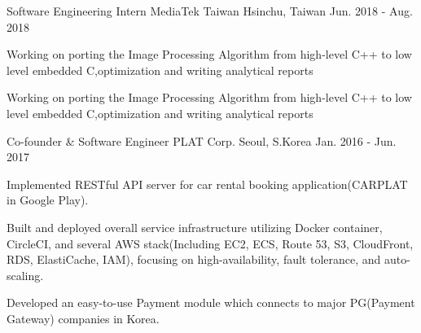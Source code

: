 

\begin{cventries}

  \cventry
    {Software Engineering Intern} %
    {MediaTek Taiwan} %
    {Hsinchu, Taiwan} %
    {Jun. 2018 - Aug. 2018} %
    {
      \begin{cvitems} %
        \item {Working on porting the Image Processing Algorithm from high-level C++ to low level embedded C,optimization and writing analytical reports}
        \item {Working on porting the Image Processing Algorithm from high-level C++ to low level embedded C,optimization and writing analytical reports}
      \end{cvitems}
    }

  \cventry
    {Co-founder \& Software Engineer} %
    {PLAT Corp.} %
    {Seoul, S.Korea} %
    {Jan. 2016 - Jun. 2017} %
    {
      \begin{cvitems} %
        \item {Implemented RESTful API server for car rental booking application(CARPLAT in Google Play).}
        \item {Built and deployed overall service infrastructure utilizing Docker container, CircleCI, and several AWS stack(Including EC2, ECS, Route 53, S3, CloudFront, RDS, ElastiCache, IAM), focusing on high-availability, fault tolerance, and auto-scaling.}
        \item {Developed an easy-to-use Payment module which connects to major PG(Payment Gateway) companies in Korea.}
      \end{cvitems}
    }


\end{cventries}
